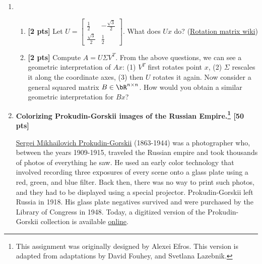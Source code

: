 \documentclass{article}
\def\pts#1{\textbf{[#1 pts]}}
\newenvironment{Q}{\clearpage \item}{\phantom{s} \bigskip}
\begin{document}
\begin{enumerate}
\begin{Q}
\begin{enumerate}
    \vspace{3cm}
    
    \item \pts2
    Let
    $U = 
    \begin{bmatrix}
         \frac{1}2 & -\frac{\sqrt{3}}2 \\
        \frac{\sqrt{3}}2 & \frac{1}2
    \end{bmatrix} .$
    What does $Ux$ do? (\href{https://en.wikipedia.org/wiki/Rotation_matrix}{Rotation matrix wiki})
    
    \vspace{3cm}
    
    \item \pts2
    Compute $A = U\Sigma V^T$. From the above questions, we can see a geometric interpretation of $Ax$: (1) $V^T$ first rotates point $x$, (2) $\Sigma$ rescales it along the coordinate axes, (3) then $U$ rotates it again.
    Now consider a general squared matrix $B \in \bR^{n\times n}$.
    How would you obtain a similar geometric interpretation for $Bx$?
    
\end{enumerate}

\end{Q} %



\begin{Q}
\textbf{Colorizing Prokudin-Gorskii images of the Russian Empire.\footnote{This assignment was originally designed by Alexei Efros. This version is adapted from adaptations by David Fouhey, and Svetlana Lazebnik.} \pts{50}}

\href{https://en.wikipedia.org/wiki/Sergey_Prokudin-Gorsky}{\color{blue}Sergei Mikhailovich Prokudin-Gorskii} (1863-1944) was a photographer who, between the years 1909-1915, traveled the Russian empire and took thousands of photos of everything he saw. He used an early color technology that involved recording three exposures of every scene onto a glass plate using a red, green, and blue filter. Back then, there was no way to print such photos, and they had to be displayed using a special projector. Prokudin-Gorskii left Russia in 1918. His glass plate negatives survived and were purchased by the Library of Congress in 1948. Today, a digitized version of the Prokudin-Gorskii collection is available \href{http://www.loc.gov/exhibits/empire/gorskii.html}{\color{blue}online}. 


\end{Q}
\end{enumerate}
\end{document}
